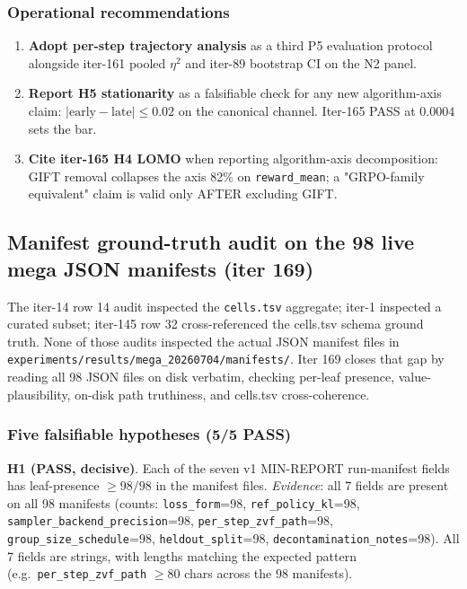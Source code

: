 \documentclass{article}  \usepackage[preprint,nonatbib]{neurips_2026} \usepackage[numbers]{natbib}
\begin{document}
\subsubsection{Operational recommendations}
\begin{enumerate}
\item \textbf{Adopt per-step trajectory analysis} as a third P5 evaluation protocol alongside iter-161 pooled $\eta^2$ and iter-89 bootstrap CI on the N2 panel.
\item \textbf{Report H5 stationarity} as a falsifiable check for any new algorithm-axis claim: $|\mathrm{early} - \mathrm{late}| \le 0.02$ on the canonical channel. Iter-165 PASS at $0.0004$ sets the bar.
\item \textbf{Cite iter-165 H4 LOMO} when reporting algorithm-axis decomposition: GIFT removal collapses the axis 82\% on \texttt{reward\_mean}; a "GRPO-family equivalent" claim is valid only AFTER excluding GIFT.
\end{enumerate} \subsection{Manifest ground-truth audit on the 98 live mega JSON manifests (iter 169)}
\label{sec:p5-iter169-manifest-audit}

The iter-14 row 14 audit inspected the \texttt{cells.tsv} aggregate; iter-1 inspected a curated subset; iter-145 row 32 cross-referenced the cells.tsv schema ground truth. None of those audits inspected the actual JSON manifest files in \texttt{experiments/results/mega\_20260704/manifests/}. Iter 169 closes that gap by reading all 98 JSON files on disk verbatim, checking per-leaf presence, value-plausibility, on-disk path truthiness, and cells.tsv cross-coherence.

\subsubsection{Five falsifiable hypotheses (5/5 PASS)}
\label{sec:p5-iter169-hypotheses}

\textbf{H1 (PASS, decisive)}. Each of the seven v1 MIN-REPORT run-manifest fields has leaf-presence $\ge 98/98$ in the manifest files. \emph{Evidence}: all 7 fields are present on all 98 manifests (counts: \texttt{loss\_form}=98, \texttt{ref\_policy\_kl}=98, \texttt{sampler\_backend\_precision}=98, \texttt{per\_step\_zvf\_path}=98, \texttt{group\_size\_schedule}=98, \texttt{heldout\_split}=98, \texttt{decontamination\_notes}=98). All 7 fields are strings, with lengths matching the expected pattern (e.g.\ \texttt{per\_step\_zvf\_path} $\ge 80$ chars across the 98 manifests).
\end{document}
